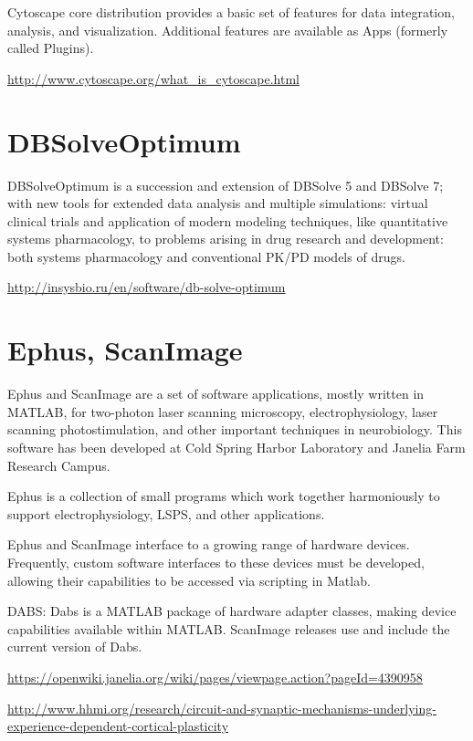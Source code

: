 Cytoscape core distribution provides a basic set of features for data
integration, analysis, and visualization. Additional features are available as
Apps (formerly called Plugins). 

\url{http://www.cytoscape.org/what_is_cytoscape.html}

\section{DBSolveOptimum }
\label{sec:DBSolve}
\label{sec:DBSolveOptimum}

DBSolveOptimum  is  a succession and extension of DBSolve 5 and DBSolve 7; with
new tools for extended data analysis and multiple simulations: virtual clinical
trials and application of modern modeling techniques, like quantitative systems
pharmacology, to problems arising in drug research and development: both systems
pharmacology and conventional PK/PD models of drugs.



\url{http://insysbio.ru/en/software/db-solve-optimum}

\section{Ephus, ScanImage}
\label{sec:ScanImage}
\label{sec:Ephus}

Ephus and ScanImage are a set of software applications, mostly written in
MATLAB, for two-photon laser scanning microscopy, electrophysiology, laser
scanning photostimulation, and other important techniques in neurobiology. This
software has been developed at Cold Spring Harbor Laboratory and Janelia Farm
Research Campus.

Ephus is a collection of small programs which work together harmoniously to
support electrophysiology, LSPS, and other applications. 

Ephus and ScanImage interface to a growing range of hardware devices.
Frequently, custom software interfaces to these devices must be developed,
allowing their capabilities to be accessed via scripting in Matlab.

DABS: Dabs is a MATLAB package of hardware adapter classes, making device
capabilities available within MATLAB. ScanImage releases use and include the
current version of Dabs.

\url{https://openwiki.janelia.org/wiki/pages/viewpage.action?pageId=4390958}

\url{http://www.hhmi.org/research/circuit-and-synaptic-mechanisms-underlying-experience-dependent-cortical-plasticity}

